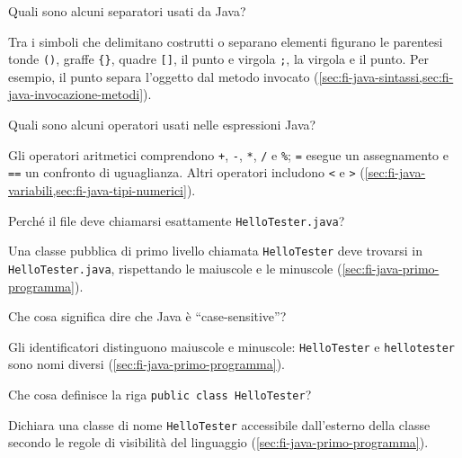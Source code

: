\begin{exercise}
\label{ex:fi-esercizi-introduzione-java-separatori}
Quali sono alcuni separatori usati da Java?
\end{exercise}

Tra i simboli che delimitano costrutti o separano elementi figurano le parentesi
tonde \texttt{()}, graffe \texttt{\{\}}, quadre \texttt{[]}, il punto e virgola
\texttt{;}, la virgola e il punto. Per esempio, il punto separa l'oggetto dal
metodo invocato (\cref{sec:fi-java-sintassi,sec:fi-java-invocazione-metodi}).

\begin{exercise}
\label{ex:fi-esercizi-introduzione-java-operatori}
Quali sono alcuni operatori usati nelle espressioni Java?
\end{exercise}

Gli operatori aritmetici comprendono \texttt{+}, \texttt{-}, \texttt{*},
\texttt{/} e \texttt{\%}; \texttt{=} esegue un assegnamento e \texttt{==} un
confronto di uguaglianza. Altri operatori includono \texttt{<} e \texttt{>}
(\cref{sec:fi-java-variabili,sec:fi-java-tipi-numerici}).

\begin{exercise}
\label{ex:fi-esercizi-introduzione-java-file-nome-pubblicaclasse}
Perché il file deve chiamarsi esattamente \texttt{HelloTester.java}?
\end{exercise}

Una classe pubblica di primo livello chiamata \texttt{HelloTester}
deve trovarsi in \texttt{HelloTester.java}, rispettando le maiuscole e
le minuscole (\cref{sec:fi-java-primo-programma}).

\begin{exercise}
\label{ex:fi-esercizi-introduzione-java-case-sensitive}
Che cosa significa dire che Java è ``case-sensitive''?
\end{exercise}

Gli identificatori distinguono maiuscole e minuscole:
\texttt{HelloTester} e \texttt{hellotester} sono nomi diversi
(\cref{sec:fi-java-primo-programma}).

\begin{exercise}
\label{ex:fi-esercizi-introduzione-java-public-class-dichiarazione}
Che cosa definisce la riga \texttt{public class HelloTester}?
\end{exercise}

Dichiara una classe di nome \texttt{HelloTester} accessibile dall'esterno della
classe secondo le regole di visibilità del linguaggio
(\cref{sec:fi-java-primo-programma}).

